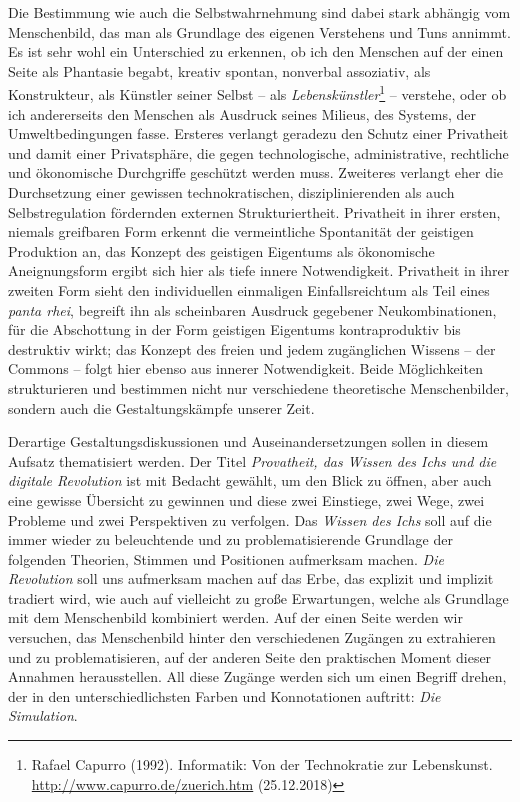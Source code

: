 \documentclass[a4paper,11pt]{article}
\begin{document}
Die Bestimmung wie auch die Selbstwahrnehmung sind dabei stark abhängig vom
Menschenbild, das man als Grundlage des eigenen Verstehens und Tuns annimmt.
Es ist sehr wohl ein Unterschied zu erkennen, ob ich den Menschen auf der
einen Seite als Phantasie begabt, kreativ spontan, nonverbal assoziativ, als
Konstrukteur, als Künstler seiner Selbst -- als
\emph{Lebenskünstler}\footnote{Rafael Capurro (1992). Informatik: Von der
  Technokratie zur Lebenskunst. \url{http://www.capurro.de/zuerich.htm}
  (25.12.2018)} -- verstehe, oder ob ich andererseits den Menschen als
Ausdruck seines Milieus, des Systems, der Umweltbedingungen fasse. Ersteres
verlangt geradezu den Schutz einer Privatheit und damit einer Privatsphäre,
die gegen technologische, administrative, rechtliche und ökonomische
Durchgriffe geschützt werden muss. Zweiteres verlangt eher die Durchsetzung
einer gewissen technokratischen, disziplinierenden als auch Selbstregulation
fördernden externen Strukturiertheit. Privatheit in ihrer ersten, niemals
greifbaren Form erkennt die vermeintliche Spontanität der geistigen Produktion
an, das Konzept des geistigen Eigentums als ökonomische Aneignungsform ergibt
sich hier als tiefe innere Notwendigkeit. Privatheit in ihrer zweiten Form
sieht den individuellen einmaligen Einfallsreichtum als Teil eines \emph{panta
  rhei}, begreift ihn als scheinbaren Ausdruck gegebener Neukombinationen, für
die Abschottung in der Form geistigen Eigentums kontraproduktiv bis destruktiv
wirkt; das Konzept des freien und jedem zugänglichen Wissens -- der Commons --
folgt hier ebenso aus innerer Notwendigkeit. Beide Möglichkeiten strukturieren
und bestimmen nicht nur verschiedene theoretische Menschenbilder, sondern auch
die Gestaltungskämpfe unserer Zeit.

Derartige Gestaltungsdiskussionen und Auseinandersetzungen sollen in diesem
Aufsatz thematisiert werden.  Der Titel \emph{Provatheit, das Wissen des Ichs
  und die digitale Revolution} ist mit Bedacht gewählt, um den Blick zu
öffnen, aber auch eine gewisse Übersicht zu gewinnen und diese zwei Einstiege,
zwei Wege, zwei Probleme und zwei Perspektiven zu verfolgen. Das \emph{Wissen
  des Ichs} soll auf die immer wieder zu beleuchtende und zu
problematisierende Grundlage der folgenden Theorien, Stimmen und Positionen
aufmerksam machen. \emph{Die Revolution} soll uns aufmerksam machen auf das
Erbe, das explizit und implizit tradiert wird, wie auch auf vielleicht zu
große Erwartungen, welche als Grundlage mit dem Menschenbild kombiniert
werden. Auf der einen Seite werden wir versuchen, das Menschenbild hinter den
verschiedenen Zugängen zu extrahieren und zu problematisieren, auf der anderen
Seite den praktischen Moment dieser Annahmen herausstellen. All diese Zugänge
werden sich um einen Begriff drehen, der in den unterschiedlichsten Farben und
Konnotationen auftritt: \emph{Die Simulation}.
\end{document}
